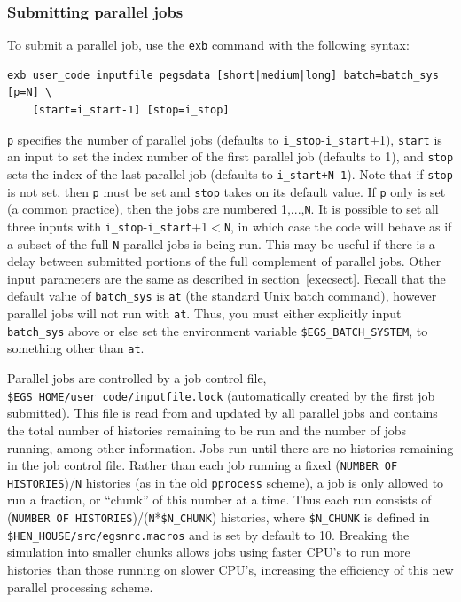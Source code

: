 \documentclass[12pt,twoside]{article}  %
\begin{document}
\subsubsection{Submitting parallel jobs}
\label{subparsect}
To submit a parallel job, use the {\tt exb} command with the following
syntax:
\begin{verbatim}
exb user_code inputfile pegsdata [short|medium|long] batch=batch_sys [p=N] \
    [start=i_start-1] [stop=i_stop]
\end{verbatim}
{\tt p} specifies the number of parallel jobs (defaults to
{\tt i\_stop}-{\tt i\_start}+1), {\tt start} is an input 
to set the index number of the
first parallel job (defaults to 1), and {\tt stop} sets the index of the 
last parallel
job (defaults to {\tt i\_start+N-1}).  Note that if {\tt stop} is not set,
then {\tt p} must be set and {\tt stop} takes on its default value.  If
{\tt p} only is set (a common practice), then the jobs are numbered
1,...,{\tt N}.  It is possible to set all three inputs with
{\tt i\_stop}-{\tt i\_start}+1$<${\tt N}, in which case the code will
behave as if a subset of the full {\tt N} parallel jobs is being
run.  This may be useful if there is a delay between submitted portions
of the full complement of parallel jobs.
Other input parameters are the same as described in section~\ref{execsect}.
Recall that the default value of {\tt batch\_sys} is {\tt at} (the
standard Unix batch command), however parallel jobs will not run with
{\tt at}.  Thus, you must either explicitly input {\tt batch\_sys} above
or else set the environment variable {\tt \$EGS\_BATCH\_SYSTEM}, 
to something other than {\tt at}.  

Parallel jobs
are controlled by a job control file,
{\tt \$EGS\_HOME/user\_code/inputfile.lock}
(automatically created by the first job submitted).  This file is read from and
updated by all parallel jobs and contains the total number of histories
remaining to be run and the number of jobs running, among other information.
Jobs run until there are no histories remaining in the job control file.
Rather than each job running a fixed ({\tt NUMBER OF HISTORIES})/{\tt N} 
histories
(as in the old {\tt pprocess} scheme), a job is only allowed to run
a fraction, or ``chunk'' of this number at a time.  Thus each run
consists of ({\tt NUMBER OF HISTORIES})/({\tt N}*{\tt \$N\_CHUNK}) 
histories, where
{\tt \$N\_CHUNK} is defined in {\tt \$HEN\_HOUSE/src/egsnrc.macros}
and is set by default to 10.  Breaking the simulation into smaller chunks allows
jobs using faster CPU's to run more histories than those running
on slower CPU's, increasing the efficiency of this new parallel processing
scheme.  
\end{document}
